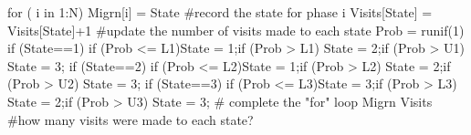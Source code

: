  
for ( i in 1:N)
{
Migrn[i] = State           	          	             #record the state for phase i
Visits[State] = Visits[State]+1           	             #update the number of visits made to each state
Prob = runif(1)
if (State==1){
             	       if (Prob <= L1){State = 1};if (Prob > L1) {State = 2};if (Prob > U1) {State = 3};
           	 	 }
if (State==2){
             	       if (Prob <= L2){State = 1};if (Prob > L2) {State = 2};if (Prob > U2) {State = 3};
           	 	          	      }
if (State==3){
             	       if (Prob <= L3){State = 3};if (Prob > L3) {State = 2};if (Prob > U3) {State = 3};
           	 	          	      }
}              # complete the "for" loop
Migrn           	          	            
Visits           	          	             #how many visits were made to each state?
 
